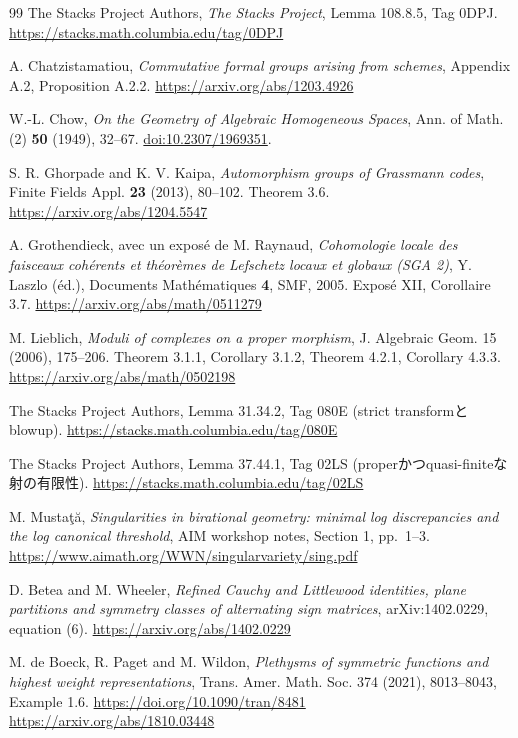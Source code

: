 \documentclass[a4paper,11pt]{ltjsarticle}
\theoremstyle{definition}
\begin{document}
\begin{thebibliography}{99}
The Stacks Project Authors,
\emph{The Stacks Project}, Lemma 108.8.5, Tag 0DPJ.
\url{https://stacks.math.columbia.edu/tag/0DPJ}

A. Chatzistamatiou,
\emph{Commutative formal groups arising from schemes},
Appendix A.2, Proposition A.2.2.
\url{https://arxiv.org/abs/1203.4926}

W.-L. Chow,
\emph{On the Geometry of Algebraic Homogeneous Spaces},
Ann. of Math. (2) \textbf{50} (1949), 32--67.
\href{https://doi.org/10.2307/1969351}{doi:10.2307/1969351}.

S. R. Ghorpade and K. V. Kaipa,
\emph{Automorphism groups of Grassmann codes},
Finite Fields Appl. \textbf{23} (2013), 80--102.
Theorem 3.6.
\url{https://arxiv.org/abs/1204.5547}

A. Grothendieck, avec un expos\'e de M. Raynaud,
\emph{Cohomologie locale des faisceaux coh\'erents et th\'eor\`emes de Lefschetz
locaux et globaux (SGA 2)},
Y. Laszlo (\'ed.), Documents Math\'ematiques \textbf{4}, SMF, 2005.
Expos\'e XII, Corollaire 3.7.
\url{https://arxiv.org/abs/math/0511279}


M. Lieblich,
\emph{Moduli of complexes on a proper morphism},
J. Algebraic Geom. 15 (2006), 175--206.
Theorem 3.1.1, Corollary 3.1.2, Theorem 4.2.1, Corollary 4.3.3.
\url{https://arxiv.org/abs/math/0502198}

The Stacks Project Authors,
Lemma 31.34.2, Tag 080E (strict transformとblowup).
\url{https://stacks.math.columbia.edu/tag/080E}

The Stacks Project Authors,
Lemma 37.44.1, Tag 02LS (properかつquasi-finiteな射の有限性).
\url{https://stacks.math.columbia.edu/tag/02LS}

M. Musta\c{t}\u{a},
\emph{Singularities in birational geometry: minimal log discrepancies and the log canonical threshold},
AIM workshop notes, Section 1, pp.~1--3.
\url{https://www.aimath.org/WWN/singularvariety/sing.pdf}


D. Betea and M. Wheeler,
\emph{Refined Cauchy and Littlewood identities, plane partitions and
symmetry classes of alternating sign matrices}, arXiv:1402.0229, equation (6).
\url{https://arxiv.org/abs/1402.0229}

M. de Boeck, R. Paget and M. Wildon,
\emph{Plethysms of symmetric functions and highest weight representations},
Trans. Amer. Math. Soc. 374 (2021), 8013--8043, Example 1.6.
\url{https://doi.org/10.1090/tran/8481}
\url{https://arxiv.org/abs/1810.03448}



\end{thebibliography}
\end{document}
